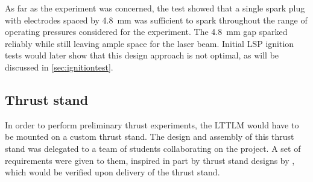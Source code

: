             As far as the experiment was concerned, the test showed that a single spark plug with electrodes spaced by 4.8~mm was sufficient to spark throughout the range of operating pressures considered for the experiment. The 4.8~mm gap sparked reliably while still leaving ample space for the laser beam. Initial LSP ignition tests would later show that this design approach is not optimal, as will be discussed in \autoref{sec:ignitiontest}.
        
        \subsection{Thrust stand}
            In order to perform preliminary thrust experiments, the LTTLM would have to be mounted on a custom thrust stand. The design and assembly of this thrust stand was delegated to a team of students collaborating on the project. A set of requirements were given to them, inspired in part by thrust stand designs by \textcite{takkenDevelopmentHightemperatureSolar2021,jansenImprovementValidationTest2016}, which would be verified upon delivery of the thrust stand.

